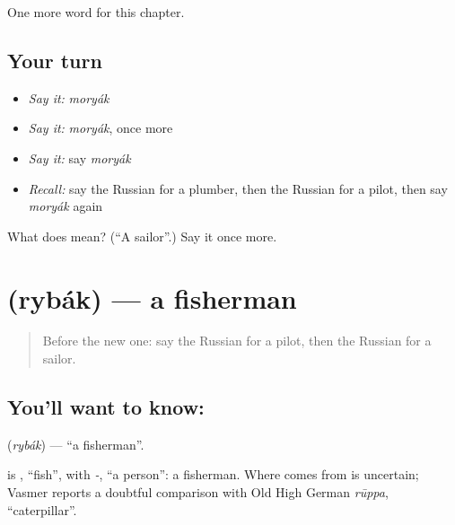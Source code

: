 \begin{grammarlens}[title={What you've built}]
One more word for this chapter.
\end{grammarlens}

\subsection*{Your turn}
\begin{itemize}
\raggedright
  \item \emph{Say it:} \emph{moryák}
  \item \emph{Say it:} \emph{moryák}, once more
  \item \emph{Say it:} say \emph{moryák}
  \item \emph{Recall:} say the Russian for a plumber, then the Russian for a pilot, then say \emph{moryák} again
\end{itemize}

\begin{tcolorbox}[breakable,colback=teal!4,colframe=teal!35!black,title={Before you move on}]
What does  mean? (\textquotedblleft{}A sailor\textquotedblright{}.) Say it once more.
\end{tcolorbox}
\section[\texorpdfstring{\ru{рыбак} (rybák)}{рыбак (rybák)}]{ (rybák) — a fisherman}

\label{lesson:RU-C202-rybak}



\begin{quote}
Before the new one: say the Russian for a pilot, then the Russian for a sailor.
\end{quote}

\subsection*{You'll want to know: }
\textbf{} (\emph{rybák}) — \textquotedblleft{}a fisherman\textquotedblright{}.

\begin{cousinweb}
\textbf{} is \emph{}, \textquotedblleft{}fish\textquotedblright{}, with \emph{-}, \textquotedblleft{}a person\textquotedblright{}: a fisherman. Where \emph{} comes from is uncertain; Vasmer reports a doubtful comparison with Old High German \emph{rūppa}, \textquotedblleft{}caterpillar\textquotedblright{}.
\end{cousinweb}

